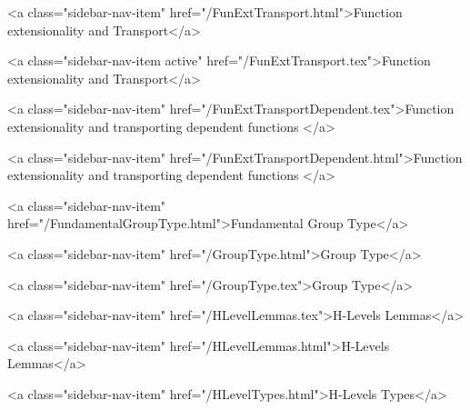       
    
      
        
          <a class="sidebar-nav-item" href="/FunExtTransport.html">Function extensionality and Transport</a>
        
      
    
      
        
          <a class="sidebar-nav-item active" href="/FunExtTransport.tex">Function extensionality and Transport</a>
        
      
    
      
        
          <a class="sidebar-nav-item" href="/FunExtTransportDependent.tex">Function extensionality and transporting dependent functions </a>
        
      
    
      
        
          <a class="sidebar-nav-item" href="/FunExtTransportDependent.html">Function extensionality and transporting dependent functions </a>
        
      
    
      
        
          <a class="sidebar-nav-item" href="/FundamentalGroupType.html">Fundamental Group Type</a>
        
      
    
      
        
          <a class="sidebar-nav-item" href="/GroupType.html">Group Type</a>
        
      
    
      
        
          <a class="sidebar-nav-item" href="/GroupType.tex">Group Type</a>
        
      
    
      
        
          <a class="sidebar-nav-item" href="/HLevelLemmas.tex">H-Levels Lemmas</a>
        
      
    
      
        
          <a class="sidebar-nav-item" href="/HLevelLemmas.html">H-Levels Lemmas</a>
        
      
    
      
        
          <a class="sidebar-nav-item" href="/HLevelTypes.html">H-Levels Types</a>
        
      
    
